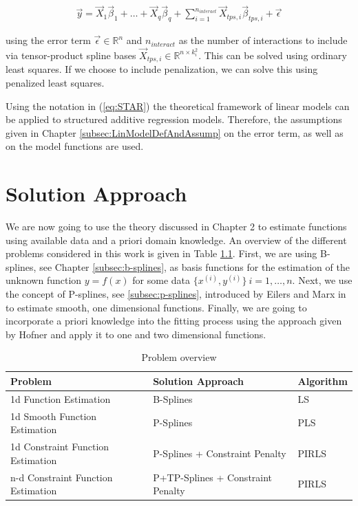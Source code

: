 \documentclass[10pt,a4paper]{report}
\begin{document}
\begin{align} \label{eq:STAR}
	\vec{y} = \vec{X}_1 \vec{\beta}_1 + \dots + \vec{X}_q \vec{\beta}_q + \sum_{i=1}^{n_{interact}} \vec{X}_{tps, i} \vec{\beta}_{tps,i} + \vec{\epsilon}
\end{align}

using the error term $\vec{\epsilon} \in \mathbb{R}^n$ and $n_{interact}$ as the number of interactions to include via tensor-product spline bases $\vec{X}_{tps,i} \in \mathbb{R}^{n \times k_i^2}$. This can be solved using ordinary least squares. If we choose to include penalization, we can solve this using penalized least squares. 

Using the notation in (\ref{eq:STAR}) the theoretical framework of linear models can be applied to structured additive regression models. Therefore, the assumptions given in Chapter \ref{subsec:LinModelDefAndAssump} on the error term, as well as on the model functions are used. \cite{fahrmeir2004penalized}

\chapter{Solution Approach}

We are now going to use the theory discussed in Chapter 2 to estimate functions using available data and a priori domain knowledge. An overview of the different problems considered in this work is given in Table \ref{tab:problem_overview}. First, we are using B-splines, see Chapter \ref{subsec:b-splines}, as basis functions for the estimation of the unknown function $y = f(x)$ for some data $\{x^{(i)}, y^{(i)}\} \ i = 1, \dots, n$.  Next, we use the concept of P-splines, see \ref{subsec:p-splines},  introduced by Eilers and Marx in \cite{eilers1996flexible} to estimate smooth, one dimensional functions. Finally, we are going to incorporate a priori knowledge into the fitting process using the approach given by Hofner and apply it to one and two dimensional functions. \cite{hofner2011monotonicity} 

\begin{table}[H]
	\centering
	\begin{tabular}{|lll|}
		\hline
		\textbf{Problem}                   & \textbf{Solution Approach}           & \textbf{Algorithm}  \\ \hline \toprule
		1d Function Estimation             & B-Splines                            & LS                  \\ \hline
		1d Smooth Function Estimation      & P-Splines                            & PLS                 \\ \hline
		1d Constraint Function Estimation  & P-Splines + Constraint Penalty       & PIRLS 			    \\ \hline 
		n-d Constraint Function Estimation & P+TP-Splines + Constraint Penalty & PIRLS 			    \\ \hline \bottomrule
	\end{tabular}
	\caption{Problem overview}
	\label{tab:problem_overview}
\end{table}
\end{document}
